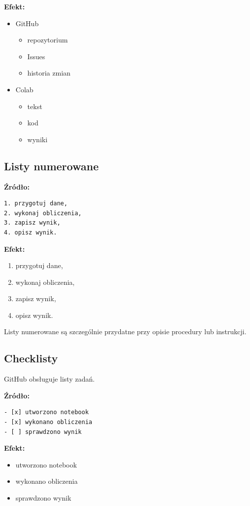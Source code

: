 \documentclass[11pt, a4paper]{article}
\begin{document}
\textbf{Efekt:}
\begin{itemize}
    \item GitHub
    \begin{itemize}
        \item repozytorium
        \item Issues
        \item historia zmian
    \end{itemize}
    \item Colab
    \begin{itemize}
        \item tekst
        \item kod
        \item wyniki
    \end{itemize}
\end{itemize}

\hrulefill
\subsection{Listy numerowane}
\textbf{Źródło:}
\begin{lstlisting}
1. przygotuj dane,
2. wykonaj obliczenia,
3. zapisz wynik,
4. opisz wynik.
\end{lstlisting}

\textbf{Efekt:}
\begin{enumerate}
    \item przygotuj dane,
    \item wykonaj obliczenia,
    \item zapisz wynik,
    \item opisz wynik.
\end{enumerate}

Listy numerowane są szczególnie przydatne przy opisie procedury lub instrukcji.

\hrulefill

\subsection{Checklisty}
GitHub obsługuje listy zadań.

\textbf{Źródło:}
\begin{lstlisting}
- [x] utworzono notebook
- [x] wykonano obliczenia
- [ ] sprawdzono wynik
\end{lstlisting}

\textbf{Efekt:}
\begin{itemize}
    \item[$\boxtimes$] utworzono notebook
    \item[$\boxtimes$] wykonano obliczenia
    \item[$\square$] sprawdzono wynik
\end{itemize}
\end{document}
